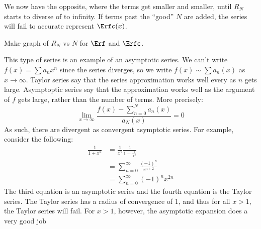         We now have the opposite, where the terms get smaller
        and smaller, until $R_{N}$ starts to diverse of to
        infinity. If terms past the ``good'' $N$ are added,
        the series will fail to accurate represent $\Erfc(x)$.
        \par\hfill\par
        Make graph of $R_{N}$ vs $N$ for $\Erf$ and $\Erfc$.
        \par\hfill\par
        This type of series is an example of an asymptotic series.
        We can't write $f(x)=\sum{a}_{n}x^{n}$ since the
        series diverges, so we write
        $f(x)\sim\sum{a}_{n}(x)$ as $x\rightarrow\infty$.
        Taylor series say that the series approximation works
        well every as $n$ gets large. Asymptoptic series say
        that the approximation works well as the argument of
        $f$ gets large, rather than the number of terms.
        More precisely:
        \begin{equation}
            \underset{x\rightarrow\infty}{\lim}
            \frac{f(x)-\sum_{n=0}^{N}a_{n}(x)}{a_{N}(x)}=0
        \end{equation}
        As such, there are divergent as convergent asymptotic
        series. For example, consider the following:
        \begin{align}
            \frac{1}{1+x^{2}}
            &=\frac{1}{x^{2}}\frac{1}{1+\frac{1}{x^{2}}}\\
            &=\sum_{n=0}^{\infty}\frac{(-1)^{n}}{x^{n+2}}\\
            &=\sum_{n=0}^{\infty}(-1)^{n}x^{2n}
        \end{align}
        The third equation is an asymptotic series and the
        fourth equation is the Taylor series. The Taylor
        series has a radius of convergence of 1, and thus for
        all $x>1$, the Taylor series will fail. For
        $x>1$, however, the asymptotic expansion does a very
        good job
